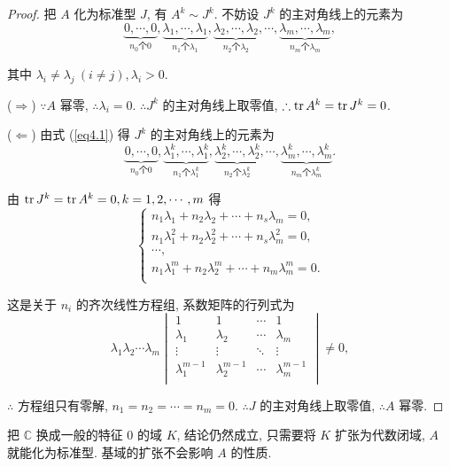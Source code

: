 \documentclass[color=black,device=normal,lang=cn,mode=geye]{elegantnote}
\begin{document}
\begin{proof}
    把 $A$ 化为标准型 $J$, 有 $A^k\sim J^k$. 不妨设 $J^k$ 的主对角线上的元素为
    \[\underbrace{0,\cdots,0}_{n_0\text{个}0},\underbrace{\lambda_1,\cdots,\lambda_1}_{n_1\text{个}\lambda_1},\underbrace{\lambda_2,\cdots,\lambda_2}_{n_2\text{个}\lambda_2},\cdots,\underbrace{\lambda_m,\cdots,\lambda_m}_{n_m\text{个}\lambda_m},\]
    
    其中 $\lambda_i\neq\lambda_j\ (i\neq j),\lambda_i>0$.

    ($\Rightarrow$) $\because A$ 幂零, $\therefore\lambda_i=0$. $\therefore J^k$ 的主对角线上取零值, $\therefore\operatorname{tr} A^k=\operatorname{tr} J^k=0$.

    ($\Leftarrow$) 由式 (\ref{eq4.1}) 得 $J^k$ 的主对角线上的元素为
    \[\underbrace{0,\cdots,0}_{n_0\text{个}0},\underbrace{\lambda^k_1,\cdots,\lambda^k_1}_{n_1\text{个}\lambda^k_1},\underbrace{\lambda^k_2,\cdots,\lambda^k_2}_{n_2\text{个}\lambda^k_2},\cdots,\underbrace{\lambda^k_m,\cdots,\lambda^k_m}_{n_m\text{个}\lambda^k_m}.\]
    
    由 $\operatorname{tr} J^k=\operatorname{tr} A^k=0,k=1,2,\cdots,m$ 得
    \[\begin{cases}
        n_1\lambda_1+n_2\lambda_2+\cdots+n_s\lambda_m=0, \\
        n_1\lambda_1^2+n_2\lambda_2^2+\cdots+n_s\lambda_m^2=0, \\
        \cdots, \\
        n_1\lambda_1^m+n_2\lambda_2^m+\cdots+n_m\lambda_m^m=0. \\
    \end{cases}\]

    这是关于 $n_i$ 的齐次线性方程组, 系数矩阵的行列式为
    \[\lambda_1\lambda_2\cdots\lambda_m\begin{vmatrix}
        1 & 1 & \cdots & 1 \\
        \lambda_1 & \lambda_2 & \cdots & \lambda_m \\
        \vdots & \vdots & \ddots & \vdots \\
        \lambda_1^{m-1} & \lambda_2^{m-1} & \cdots & \lambda_m^{m-1} \\
    \end{vmatrix}\neq0,\]

    $\therefore$ 方程组只有零解, $n_1=n_2=\cdots=n_m=0$. $\therefore J$ 的主对角线上取零值, $\therefore A$ 幂零.
\end{proof}
\begin{note}
    把 $\mathbb{C}$ 换成一般的特征 $0$ 的域 $K$, 结论仍然成立, 只需要将 $K$ 扩张为代数闭域, $A$ 就能化为标准型. 基域的扩张不会影响 $A$ 的性质.
\end{note}
\end{document}
